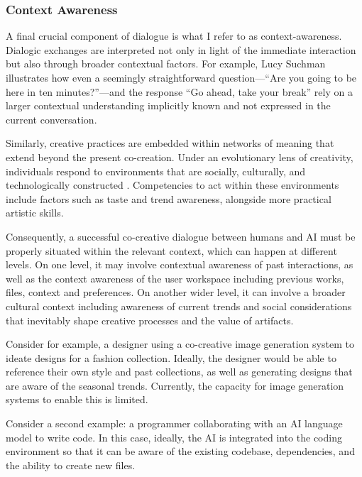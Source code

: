 \subsubsection{Context Awareness}

A final crucial component of dialogue is what I refer to as context-awareness. Dialogic exchanges are interpreted not only in light of the immediate interaction but also through broader contextual factors. For example, Lucy Suchman \cite{Suchman2006-bs} illustrates how even a seemingly straightforward question—“Are you going to be here in ten minutes?”—and the response “Go ahead, take your break” rely on a larger contextual understanding implicitly known and not expressed in the current conversation. 

Similarly, creative practices are embedded within networks of meaning that extend beyond the present co-creation. Under an evolutionary lens of creativity, individuals respond to environments that are socially, culturally, and technologically constructed \cite{Bown2021-os}. Competencies to act within these environments include factors such as taste and trend awareness, alongside more practical artistic skills.

Consequently, a successful co-creative dialogue between humans and AI must be properly situated within the relevant context, which can happen at different levels. On one level, it may involve contextual awareness of past interactions, as well as the context awareness of the user workspace including previous works, files, context and preferences. On another wider level, it can involve a broader cultural context including awareness of current trends and social considerations that inevitably shape creative processes and the value of artifacts.

Consider for example, a designer using a co-creative image generation system to ideate designs for a fashion collection. Ideally, the designer would be able to reference their own style and past collections, as well as generating designs that are aware of the seasonal trends. Currently, the capacity for image generation systems to enable this is limited.

Consider a second example: a programmer collaborating with an AI language model to write code. In this case, ideally, the AI is integrated into the coding environment so that it can be aware of the existing codebase, dependencies, and the ability to create new files. 

